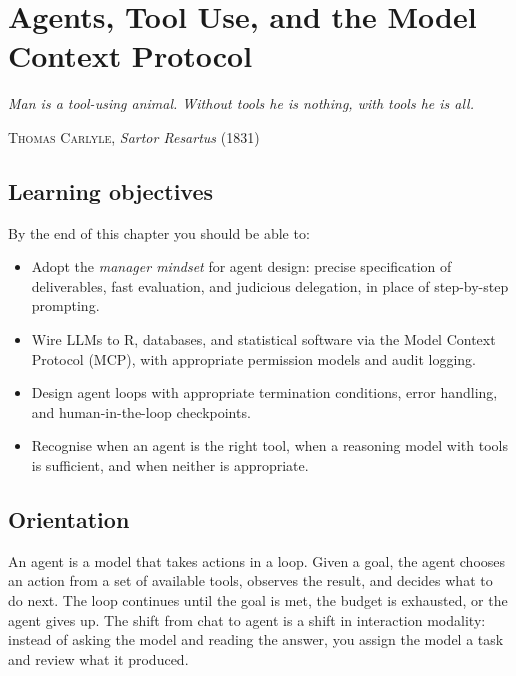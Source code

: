 \documentclass[
  letterpaper,
  11pt]{scrbook}
\providecommand{\tightlist}{%
  \setlength{\itemsep}{0pt}\setlength{\parskip}{0pt}}
\begin{document}
\chapter{Agents, Tool Use, and the Model Context
Protocol}\label{sec-agents-mcp}

\begin{flushright}\small

\emph{Man is a tool-using animal. Without tools he is nothing, with
tools he is all.}

\textsc{Thomas Carlyle}, \emph{Sartor Resartus} (1831)

\end{flushright}

\section{Learning objectives}\label{learning-objectives-7}

By the end of this chapter you should be able to:

\begin{itemize}
\tightlist
\item
  Adopt the \emph{manager mindset} for agent design: precise
  specification of deliverables, fast evaluation, and judicious
  delegation, in place of step-by-step prompting.
\item
  Wire LLMs to R, databases, and statistical software via the Model
  Context Protocol (MCP), with appropriate permission models and audit
  logging.
\item
  Design agent loops with appropriate termination conditions, error
  handling, and human-in-the-loop checkpoints.
\item
  Recognise when an agent is the right tool, when a reasoning model with
  tools is sufficient, and when neither is appropriate.
\end{itemize}

\section{Orientation}\label{orientation-7}

An agent is a model that takes actions in a loop. Given a goal, the
agent chooses an action from a set of available tools, observes the
result, and decides what to do next. The loop continues until the goal
is met, the budget is exhausted, or the agent gives up. The shift from
chat to agent is a shift in interaction modality: instead of asking the
model and reading the answer, you assign the model a task and review
what it produced.
\end{document}
